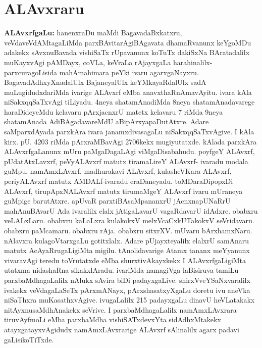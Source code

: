 \makeatletter
\def\@makechapterhead#1{%
  \vspace*{30\p@}%
\vspace*{25\p@}%
  {\parindent \z@ \centering \normalfont
    \ifnum \c@secnumdepth >\m@ne
      \if@mainmatter
        {\huge\bfseries  #1}\par\nobreak
	\vskip 4pt
      \fi
    \fi
\smallskip 

 \vskip 10\p@  
{\fontsize{12pt}{12pt}\selectfont\raggedleft{anu: \bf pu.ti.na.}\par}
  }
\vskip 40\p@}
\makeatother

\chapter{ALAvxraru}\label{chap008}

{\textbf{ALAvxrfgaLu:}} hanenxraDu maMdi BagavadaBxkatxru, veVdaveVdAMtagaLiMda parxBAvitarAgi\break BAgavata dhamaRvanunx keYgoMDu adakekx sAvxnuBavada vishiSaTx rUpavanunx koTuTx dakiSxNa BArata\-dalilx  muKayxvAgi pAMDayx, coVLa, keVraLa rAjayxgaLa harahinalilx-parxcuragoLisida mahAmahimara peYki ivaru agarxgaNayxru. BagavadAdhxyXnadalUlx BajaneyalUlx keYMkayaR\-dalUlx sadA muLugidudxdariMda ivarige ALAvxrf eMba anavxthaRnAmavAyitu. ivara kAla niSakxqqSaTxvAgi tiLiyadu. 4neya shatamAnadiMda 8neya shatamAnadavarege haraDideyeMdu kelavaru pArxjacnxrU matetx kelavaru 7 riMda 9neya shatamAnada AdiBAgadavareMdU aBipArxyapaDutAtxre. Adare saMparxdAyada parxkAra ivara janamxdivasagaLu niSakxqqSaTxvAgive. I kAla kirx. pU. 4203 riMda pArxraMBavAgi 2706kekx mugiyutatxde. kAlada parxkAra ALAvxrfgaLanunx mUru paMgaDagaLAgi viMgaDisabahudu. poyfgeY ALAvxrf, pUdatAtxLavxrf, peVyALAvxrf matutx tiramaLireY ALAvxrf- ivaradu modala guMpu. namAmxLAvxrf, madhurakavi ALAvxrf, kulasheVKara ALAvxrf, periyALAvxrf matutx AMDALf-ivaradu eraDaneyadu. toMDaraDipopxDi ALAvxrf, tirupApxNALAvxrf matutx tirumaMgeY ALAvxrf ivaru mUraneya guMpige barutAtxre. apUvaR parxtiBAsaMpananxrU jAcnxnapUNaRrU mahAnuBAvarU Ada ivaralilx elalx jAtigaLavarU vagaRdavarU idAdxre. obabxru veLALxLaru. obabxru kaLaLxra kulakokxV melxVcaCxkUTakokxV seVridavaru. obabxru paMcamaru. obabxru rAja. obabxru sitxrXV. mUvaru bArxhamxNaru. nAlavxra kulagoVtarxgaLu gotitxlalx. Adare pUjayxteyalilx elalxrU samAnaru matutx AcAyaRrugaLigiMta migilu. tAnolidavarige Atamx tananx meYyanunx vivaravAgi teredu toVrutatxde eMba shurxtivAkayxkekx I ALAvxrfgaLigiMta utatxma nidashaRna sikakxlAradu. ivariMda namagiVga laBisiruva tamiLu parxbaMdhagaLalilx nAlukx sAvira biDi padayxgaLive. shirxVveYSaNxvaralilx ivakekx veVdagaLaSeTx pArxmANayx, pArxshasatxyXgaLu doretu ivu aneVka niSaThxra muKasathxvAgive. ivugaLalilx 215 padayxgaLu dinavU heVLatakakx nitAyxnusaMdhAnakekx seVrive. I parxbaMdhagaLalilx namAmxLAvxrara tiruvAyfmoLi eMba parxbaMdha vishiSATxdevxYta sidAdhxMtakekx atayxgatayxvAgidudx namAmxLAvxrarige ALAvxrf sAlinalilx agarx padavi gaLisikoTiTxde.

